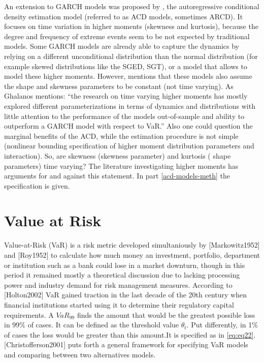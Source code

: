 \documentclass[a4paper, twoside]{templates/ociamthesis}
\begin{document}
An extension to GARCH models was proposed by \textcite{hansen1994}, the autoregressive conditional density estimation model (referred to as ACD models, sometimes ARCD). It focuses on time variation in higher moments (skewness and kurtosis), because the degree and frequency of extreme events seem to be not expected by traditional models. Some GARCH models are already able to capture the dynamics by relying on a different unconditional distribution than the normal distribution (for example skewed distributions like the SGED, SGT), or a model that allows to model these higher moments. However, \textcite{ghalanos2016} mentions that these models also assume the shape and skewness parameters to be constant (not time varying). As Ghalanos mentions: ``the research on time varying higher moments has mostly explored different parameterizations in terms of dynamics and distributions with little attention to the performance of the models out-of-sample and ability to outperform a GARCH model with respect to VaR.'' Also one could question the marginal benefits of the ACD, while the estimation procedure is not simple (nonlinear bounding specification of higher moment distribution parameters and interaction). So, are skewness (skewness parameter) and kurtosis ( shape parameters) time varying? The literature investigating higher moments has arguments for and against this statement. In part \ref{acd-models-meth} the specification is given.

\hypertarget{value-at-risk}{%
\section{Value at Risk}\label{value-at-risk}}

Value-at-Risk (VaR) is a risk metric developed simultaniously by {[}Markowitz1952{]} and {[}Roy1952{]} to calculate how much money an investment, portfolio, department or institution such as a bank could lose in a market downturn, though in this period it remained mostly a theoretical discussion due to lacking processing power and industry demand for risk management measures. According to {[}Holton2002{]} VaR gained traction in the last decade of the 20th century when financial institutions started using it to determine their regulatory capital requirements. A \(VaR_{99}\) finds the amount that would be the greatest possible loss in 99\% of cases. It can be defined as the threshold value \(\theta_t\). Put differently, in 1\% of cases the loss would be greater than this amount.It is specified as in \eqref{eq:eq22}. {[}Christofferson2001{]} puts forth a general framework for specifying VaR models and comparing between two alternatives models.
\end{document}
